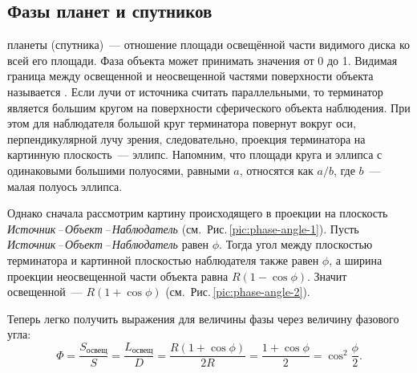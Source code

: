 \subsection{Фазы планет и спутников}

 планеты (спутника)~--- отношение площади освещённой  части видимого диска ко всей его площади. Фаза объекта может принимать значения от 0 до 1. Видимая граница между освещенной и неосвещенной частями поверхности объекта называется . Если лучи от источника считать параллельными, то терминатор является большим кругом на поверхности сферического объекта наблюдения. При этом для наблюдателя большой круг терминатора повернут вокруг оси, перпендикулярной лучу зрения, следовательно, проекция терминатора на картинную плоскость~--- эллипс. Напомним, что площади круга и эллипса с одинаковыми большими полуосями, равными $a$, относятся как $a/b$, где $b$~--- малая полуось эллипса. 


Однако сначала рассмотрим картину происходящего в проекции на плоскость {\slshape Источник\,--\,Объект\,--\,Наблюдатель} (см.~Рис.\,\ref{pic:phase-angle-1}). Пусть  {\slshape Источник\,--\,Объект\,--\,Наблюдатель} равен $\phi$. Тогда угол между плоскостью терминатора и картинной плоскостью наблюдателя также равен $\phi$, а ширина проекции неосвещенной части объекта равна $R(1 - \cos \phi)$. Значит освещенной~--- $R( 1+ \cos \phi)$ (см.~Рис.\,\ref{pic:phase-angle-2}).

Теперь легко получить выражения для величины фазы через величину фазового угла:
\begin{equation}
	\Phi = \frac{S_\text{освещ}}{S} = \frac{L_\text{освещ}}{D} = \frac{R ( 1 + \cos \phi )}{2R} = \frac{1 + \cos \phi}{2} =  \cos^2 \frac{\phi}{2}.
\end{equation}

